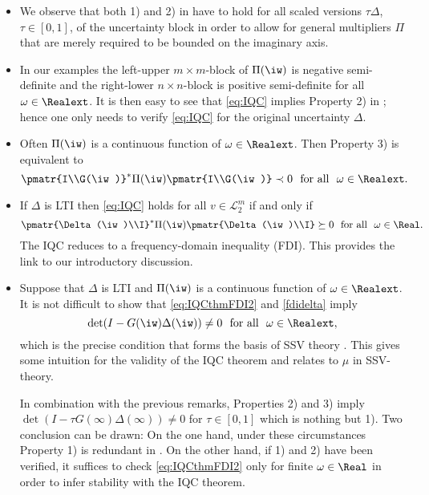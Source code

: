 \begin{rem}\mbox{}\label{remiqc}
\begin{itemize}
  \item We observe that both 1) and 2) in   have to hold for all scaled versions $\tau\Delta$, $\tau\in[0,1]$, of the uncertainty block in order to allow for general multipliers $\Pi$ that are merely required to be bounded on the imaginary axis.
\item In our examples the left-upper $m\times m$-block of $\Pi(\iw)$ is negative semi-definite and the right-lower $n\times n$-block is positive semi-definite for all $\omega\in\Realext$. It is then easy to see that \eqref{eq:IQC} implies Property 2) in ; hence one only needs to verify \eqref{eq:IQC} for the original uncertainty $\Delta$.
\item
Often $\Pi(\iw)$ is a continuous function of $\omega\in\Realext$. Then Property 3) is equivalent to
\begin{equation}
\pmatr{I\\G(\iw)}^*\Pi(\iw)\pmatr{I\\G(\iw)} \prec 0
\text{\ \ for all\ \ }\omega\in\Realext.
\label{eq:IQCthmFDI2}
\end{equation}
\item If $\Delta$ is LTI then \eqref{eq:IQC} holds for all $v\in\mathcal{L}^m_2$ if and only if
\begin{equation}
\pmatr{\Delta(\iw)\\I}^*\Pi(\iw)\pmatr{\Delta(\iw)\\I} \succeq 0
\text{\ \ for all\ \ }\omega\in\Real.
\label{fdidelta}
\end{equation}
The IQC reduces to a frequency-domain inequality (FDI). This provides the link to our introductory discussion.
\item
Suppose that $\Delta$ is LTI and $\Pi(\iw)$ is a continuous function
of $\omega\in\Realext$. It is not difficult to show that \eqref{eq:IQCthmFDI2} and \eqref{fdidelta} imply
\begin{equation}
\det(I-G(\iw)\Delta(\iw))\neq 0\text{\ \ for all\ \ }\omega\in\Realext,
\end{equation}
which is the precise condition that forms the basis of SSV theory \cite{packdoyle}. This gives some intuition for the validity
of the IQC theorem and relates to $\mu$ in SSV-theory.

In combination with the previous remarks, Properties 2) and 3) imply
$\det(I-\tau G(\infty)\Delta(\infty))\neq 0$ for $\tau\in[0,1]$
which is nothing but 1).
Two conclusion can be drawn: On the one hand, under these circumstances Property 1) is redundant in . On the other hand, if 1) and 2) have been verified, it suffices to check \eqref{eq:IQCthmFDI2} only for finite $\omega\in\Real$ in order to infer stability with the IQC theorem.
\end{itemize}
\end{rem}


